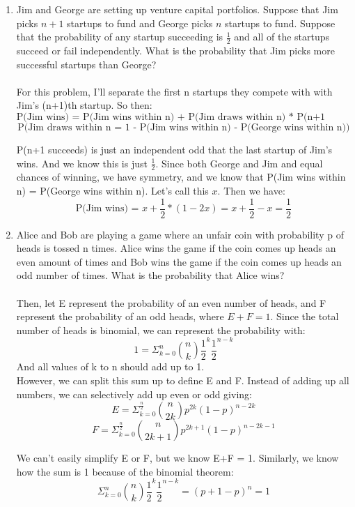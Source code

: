 \begin{enumerate}
  \item Jim and George are setting up venture capital portfolios. Suppose that Jim picks $n + 1$ startups to fund and George picks $n$ startups to fund. Suppose that the probability of any startup succeeding is $\frac{1}{2}$ and all of the startups succeed or fail independently. What is the probability that Jim picks more successful startups than George?\\\\

    For this problem, I'll separate the first n startups they compete with with Jim's (n+1)th startup. So then:
    $$\text{P(Jim wins) = P(Jim wins within n) + P(Jim draws within n) * P(n+1 succeeds)}$$
    $$\text{P(Jim draws within n = 1 - P(Jim wins within n) - P(George wins within n))}$$

    P(n+1 succeeds) is just an independent odd that the last startup of Jim's wins. And we know this is just $\frac{1}{2}$.
    Since both George and Jim and equal chances of winning, we have symmetry, and we know that P(Jim wins within n) = P(George wins within n). Let's call this $x$. Then we have:
    $$\text{P(Jim wins) = } x + \frac{1}{2} * (1 - 2x) = x + \frac{1}{2} - x = \frac{1}{2}$$

  \item Alice and Bob are playing a game where an unfair coin with probability p of heads is tossed n times. Alice wins the game if the coin comes up heads an even amount of times and Bob wins the game if the coin comes up heads an odd number
of times. What is the probability that Alice wins?\\\\

  Then, let E represent the probability of an even number of heads, and F represent the probability of an odd heads, where $E + F = 1$. Since the total number of heads is binomial, we can represent the probability with:
  $$1 = \Sigma_{k=0}^n \binom{n}{k} \frac{1}{2}^k \frac{1}{2}^{n-k}$$
  And all values of k to n should add up to 1.\\

  However, we can split this sum up to define E and F. Instead of adding up all numbers, we can selectively add up even or odd giving:
  $$E = \Sigma_{k=0}^{\frac{n}{2}} \binom{n}{2k} p^{2k} (1-p)^{n-2k}$$
  $$F = \Sigma_{k=0}^{\frac{n}{2}} \binom{n}{2k+1} p^{2k+1} (1-p)^{n-2k-1}$$

  We can't easily simplify E or F, but we know E+F = 1. Similarly, we know how the sum is 1 because of the binomial theorem:
  $$\Sigma_{k=0}^n \binom{n}{k} \frac{1}{2}^k \frac{1}{2}^{n-k} = (p+1-p)^n = 1$$
  


\end{enumerate}
